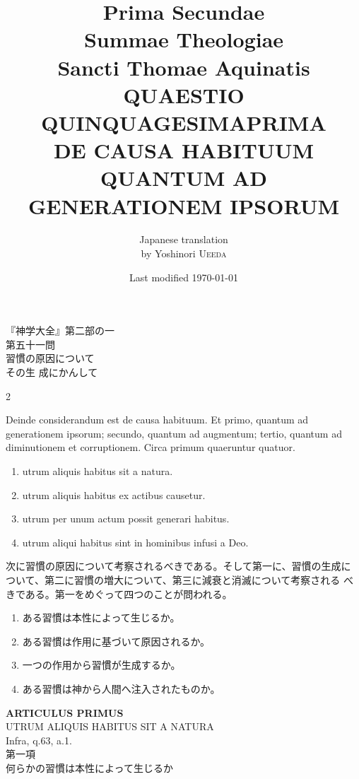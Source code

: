\documentclass[paper=a4paper,fontsize=10pt,jafontsize=9pt,titlepage]{jlreq}
\title{{\bfseries Prima Secundae}\\{\Huge Summae Theologiae}\\Sancti Thomae
Aquinatis\\{\sffamily QUAESTIO QUINQUAGESIMAPRIMA}\\{\bfseries DE CAUSA
HABITUUM QUANTUM AD GENERATIONEM IPSORUM}}
\author{Japanese translation\\by Yoshinori {\scshape Ueeda}}
\date{Last modified \today}
\begin{document}
\maketitle
\thispagestyle{empty}
\begin{center}
{\Large 『神学大全』第二部の一\\第五十一問\\習慣の原因について\\その生
 成にかんして}
\end{center}


\begin{paracol}{2}

Deinde considerandum est de causa habituum. Et primo, quantum ad
generationem ipsorum; secundo, quantum ad augmentum; tertio, quantum
ad diminutionem et corruptionem. Circa primum quaeruntur
quatuor. 


\begin{enumerate}
 \item utrum aliquis habitus sit a natura.
 \item utrum aliquis habitus ex actibus causetur.
 \item utrum per unum actum possit generari habitus.
 \item utrum aliqui habitus sint in hominibus infusi a Deo.
\end{enumerate}

\switchcolumn

次に習慣の原因について考察されるべきである。そして第一に、習慣の生成に
 ついて、第二に習慣の増大について、第三に減衰と消滅について考察される
 べきである。第一をめぐって四つのことが問われる。

\begin{enumerate}
 \item ある習慣は本性によって生じるか。
 \item ある習慣は作用に基づいて原因されるか。
 \item 一つの作用から習慣が生成するか。
 \item ある習慣は神から人間へ注入されたものか。
\end{enumerate}

\end{paracol}
\newpage
{}
{}
\setcounter{section}{1}
\setcounter{subsection}{0}

\begin{center}
{\Large {\bfseries ARTICULUS PRIMUS}}\\
{\large UTRUM ALIQUIS HABITUS SIT A NATURA}\\
{\footnotesize Infra, q.63, a.1.}\\
{\Large 第一項\\何らかの習慣は本性によって生じるか}
\end{center}
\end{document}
